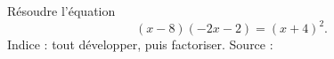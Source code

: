 
\begin{exercice}\label{exoPremiere-0042}

    Résoudre l'équation 
    \begin{equation}
        (x-8)(-2x-2)=(x+4)^2.
    \end{equation}
    Indice : tout développer, puis factoriser. Source : \cite{LVLruu}

\end{exercice}
